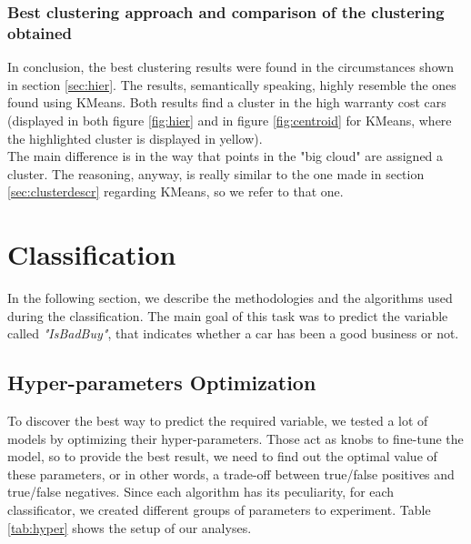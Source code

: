 \documentclass{article}
\begin{document}
	
	\subsubsection{Best clustering approach and comparison of the clustering obtained}
	In conclusion, the best clustering results were found in the circumstances shown in section \ref{sec:hier}. The results, semantically speaking, highly resemble the ones found using KMeans. Both results find a cluster in the high warranty cost cars (displayed in both figure \ref{fig:hier} and in figure \ref{fig:centroid} for KMeans, where the highlighted cluster is displayed in yellow).\\
	The main difference is in the way that points in the "big cloud" are assigned a cluster. The reasoning, anyway, is really similar to the one made in section \ref{sec:clusterdescr} regarding KMeans, so we refer to that one.
	
	
	
	\newpage
	\section{Classification}
	\label{sec:classification}
	In the following section, we describe the methodologies and the algorithms used during the classification. The main goal of this task was to predict the variable called \textit{"IsBadBuy"}, that indicates whether a car has been a good business or not.
	
	\subsection{Hyper-parameters Optimization}
	To discover the best way to predict the required variable, we tested a lot of models by optimizing their hyper-parameters. Those act as knobs to fine-tune the model, so to provide the best result, we need to find out the optimal value of these parameters, or in other words, a trade-off between true/false positives and true/false negatives. Since each algorithm has its peculiarity, for each classificator, we created different groups of parameters to experiment. Table \ref{tab:hyper} shows the setup of our analyses.
	
\end{document}
